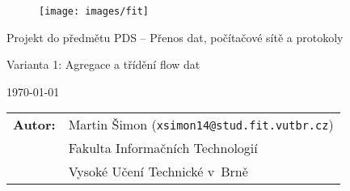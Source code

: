 \begin{titlepage}

\vspace*{1cm}

\begin{figure}
  \centering
  \texttt{[image: images/fit]}
\end{figure}

\vspace*{5mm}

\begin{center}
\begin{Large}
Projekt do předmětu PDS -- Přenos dat, počítačové sítě a protokoly
\end{Large}
\end{center}

\vspace*{5mm}

\begin{center}
\begin{Huge}
Varianta 1: Agregace a třídění flow dat \\
\end{Huge}
\end{center}

\vspace*{1cm}

\begin{center}
\begin{Large}
\today
\end{Large}
\end{center}

\vfill

\begin{flushleft}
\begin{large}
\begin{tabular}{ll}

\bf Autor:\hspace{3mm} & Martin Šimon (\verb_xsimon14@stud.fit.vutbr.cz_) \\
& Fakulta Informačních Technologií \\
& Vysoké Učení Technické v~Brně

\end{tabular}
\end{large}
\end{flushleft}

\end{titlepage}

